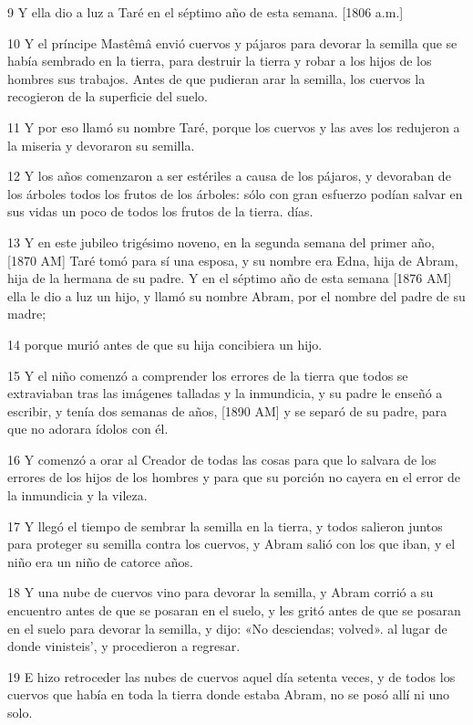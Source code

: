 \par 9 Y ella dio a luz a Taré en el séptimo año de esta semana. [1806 a.m.]
\par 10 Y el príncipe Mastêmâ envió cuervos y pájaros para devorar la semilla que se había sembrado en la tierra, para destruir la tierra y robar a los hijos de los hombres sus trabajos. Antes de que pudieran arar la semilla, los cuervos la recogieron de la superficie del suelo.
\par 11 Y por eso llamó su nombre Taré, porque los cuervos y las aves los redujeron a la miseria y devoraron su semilla.
\par 12 Y los años comenzaron a ser estériles a causa de los pájaros, y devoraban de los árboles todos los frutos de los árboles: sólo con gran esfuerzo podían salvar en sus vidas un poco de todos los frutos de la tierra. días.
\par 13 Y en este jubileo trigésimo noveno, en la segunda semana del primer año, [1870 AM] Taré tomó para sí una esposa, y su nombre era Edna, hija de Abram, hija de la hermana de su padre. Y en el séptimo año de esta semana [1876 AM] ella le dio a luz un hijo, y llamó su nombre Abram, por el nombre del padre de su madre;
\par 14 porque murió antes de que su hija concibiera un hijo.
\par 15 Y el niño comenzó a comprender los errores de la tierra que todos se extraviaban tras las imágenes talladas y la inmundicia, y su padre le enseñó a escribir, y tenía dos semanas de años, [1890 AM] y se separó de su padre, para que no adorara ídolos con él.
\par 16 Y comenzó a orar al Creador de todas las cosas para que lo salvara de los errores de los hijos de los hombres y para que su porción no cayera en el error de la inmundicia y la vileza.
\par 17 Y llegó el tiempo de sembrar la semilla en la tierra, y todos salieron juntos para proteger su semilla contra los cuervos, y Abram salió con los que iban, y el niño era un niño de catorce años.
\par 18 Y una nube de cuervos vino para devorar la semilla, y Abram corrió a su encuentro antes de que se posaran en el suelo, y les gritó antes de que se posaran en el suelo para devorar la semilla, y dijo: «No desciendas; volved». al lugar de donde vinisteis', y procedieron a regresar.
\par 19 E hizo retroceder las nubes de cuervos aquel día setenta veces, y de todos los cuervos que había en toda la tierra donde estaba Abram, no se posó allí ni uno solo.
